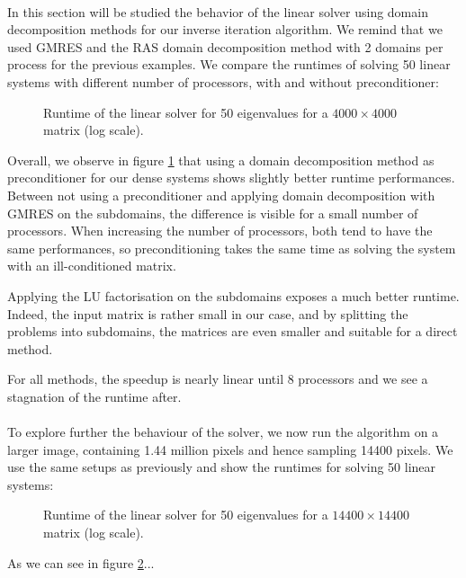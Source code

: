 \paragraph{}
In this section will be studied the behavior of the linear solver using domain decomposition methods for our inverse iteration algorithm.
We remind that we used GMRES and the RAS domain decomposition method with 2 domains per process for the previous examples.
We compare the runtimes of solving 50 linear systems with different number of processors, with and without preconditioner:

\begin{figure}[H]
 \centering
 
 \caption{Runtime of the linear solver for 50 eigenvalues for a \(4000 \times 4000\) matrix (log scale).}
 \label{fig:linear_solver}
\end{figure}

Overall, we observe in figure \ref{fig:linear_solver} that using a domain decomposition method as preconditioner for our dense systems shows slightly better runtime performances.
Between not using a preconditioner and applying domain decomposition with GMRES on the subdomains, the difference is visible for a small number of processors.
When increasing the number of processors, both tend to have the same performances, so preconditioning takes the same time as solving the system with an ill-conditioned matrix.

Applying the LU factorisation on the subdomains exposes a much better runtime.
Indeed, the input matrix is rather small in our case, and by splitting the problems into subdomains, the matrices are even smaller and suitable for a direct method.

For all methods, the speedup is nearly linear until 8 processors and we see a stagnation of the runtime after.

\paragraph{}
To explore further the behaviour of the solver, we now run the algorithm on a larger image, containing 1.44 million pixels and hence sampling 14400 pixels.
We use the same setups as previously and show the runtimes for solving 50 linear systems:

\begin{figure}[H]
 \centering
 
 \caption{Runtime of the linear solver for 50 eigenvalues for a \(14400 \times 14400\) matrix (log scale).}
 \label{fig:linear_solver_big}
\end{figure}

As we can see in figure \ref{fig:linear_solver_big}...
